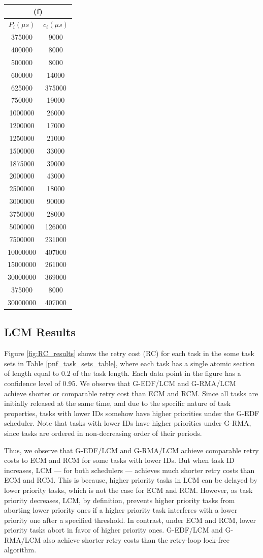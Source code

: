 \documentclass[a4paper,english]{article}
\providecommand{\tabularnewline}{\\}
\begin{document}
\begin{flushleft}
\begin{table}[htbp]
\begin{centering}
\begin{tabular}{|c|c|}
\multicolumn{2}{c}{(f)}\tabularnewline
\hline 
$P_{i}(\mu s)$ & $c_{i}(\mu s)$\tabularnewline
\hline 
375000 & 9000\tabularnewline
\hline 
400000 & 8000\tabularnewline
\hline 
500000 & 8000\tabularnewline
\hline 
600000 & 14000\tabularnewline
\hline 
625000 & 375000\tabularnewline
\hline 
750000 & 19000\tabularnewline
\hline 
1000000 & 26000\tabularnewline
\hline 
1200000 & 17000\tabularnewline
\hline 
1250000 & 21000\tabularnewline
\hline 
1500000 & 33000\tabularnewline
\hline 
1875000 & 39000\tabularnewline
\hline 
2000000 & 43000\tabularnewline
\hline 
2500000 & 18000\tabularnewline
\hline 
3000000 & 90000\tabularnewline
\hline 
3750000 & 28000\tabularnewline
\hline 
5000000 & 126000\tabularnewline
\hline 
7500000 & 231000\tabularnewline
\hline 
10000000 & 407000\tabularnewline
\hline 
15000000 & 261000\tabularnewline
\hline 
30000000 & 369000\tabularnewline
\hline 
375000 & 8000\tabularnewline
\hline 
30000000 & 407000\tabularnewline
\hline 
\end{tabular}
\par\end{centering}

\end{table}

\par\end{flushleft}

\subsection{LCM Results}

Figure \ref{fig:RC_results} shows the retry cost (RC) 
for each task in the some task sets in Table \ref{pnf_task_sets_table}, where each task has a single atomic section of length equal to 0.2 of the task length. Each data point in the figure has a confidence level of 0.95. We observe that G-EDF/LCM and G-RMA/LCM achieve shorter
or comparable retry cost than ECM and RCM. Since all tasks are initially
released at the same time, and due to the specific nature of task properties, tasks with lower IDs somehow have higher priorities under the G-EDF scheduler. Note that tasks with lower IDs have higher priorities under G-RMA, since tasks are ordered in non-decreasing order of their periods. 

Thus, we observe that G-EDF/LCM and G-RMA/LCM achieve comparable retry costs
to ECM and RCM for some tasks with lower IDs. But when task ID increases,
LCM --- for both schedulers --- achieves much shorter retry costs 
than ECM and RCM. 
This is because, higher priority tasks in LCM can be delayed by lower priority tasks, which is not the case for ECM and RCM. However, as task priority decreases, LCM, by definition, prevents higher priority
tasks from aborting lower priority ones if a higher priority task
interferes with a lower priority one after a specified threshold. In contrast, under ECM and RCM, lower priority tasks abort in favor of higher priority ones. G-EDF/LCM and G-RMA/LCM also achieve shorter retry costs than the retry-loop lock-free algorithm.
\end{document}

